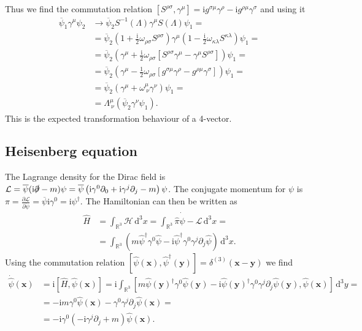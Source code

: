 \documentclass[english, parskip=full]{scrartcl}
\newcommand{\intr}{}
\newcommand{\kla}{}
\newcommand{\klam}{}
\renewcommand{\i}{\text{i}}
\begin{document}
Thus we find the commutation relation $\klam\left[ S^{\rho\sigma} , \gamma^\mu  \right] = \i g^{\sigma\mu} \gamma^\rho - \i g^{\rho\mu} \gamma^\sigma $ and using it
\begin{align}
\overline{\psi}_1 \gamma^\mu \psi_2 &\longrightarrow \overline{\psi}_2 S^{-1}(\Lambda) \gamma^\mu S(\Lambda) \psi_1 = \\
&= \overline{\psi}_2 \left( 1 + \frac{\i}{2} \omega_{\rho\sigma}S^{\rho\sigma} \right) \gamma^\mu \kla\left( 1 - \frac{\i}{2} \omega_{\kappa\lambda} S^{\kappa\lambda} \right) \psi_1 = \\
&= \overline{\psi}_2 \kla\left( \gamma^\mu + \frac{\i}{2} \omega_{\rho\sigma} \klam\left[ S^{\rho\sigma} \gamma^\mu - \gamma^\mu S^{\rho \sigma} \right] \right) \psi_1 = \\
&= \overline{\psi}_2 \kla\left( \gamma^\mu - \frac{1}{2} \omega_{\rho\sigma} \klam\left[ g^{\sigma\mu}\gamma^\rho - g^{\rho\mu} \gamma^\sigma \right] \right) \psi_1 = \\
&= \overline{\psi}_2 \kla\left( \gamma^\mu + \omega_{\ \nu}^\mu \gamma^\nu \right) \psi_1 = \\
&= \Lambda^\mu_{\ \nu} \kla\left( \overline{\psi}_2 \gamma^\nu \psi_1 \right).
\end{align}
This is the expected transformation behaviour of a 4-vector.
\subsection{Heisenberg equation}
The Lagrange density for the Dirac field is $\mathcal{L} = \overline{\psi} (\i\slashed{\partial} - m) \psi = \overline{\psi} \kla\left( \i \gamma^0\partial_0 + \i\gamma^j\partial_j - m \right) \psi$.
The conjugate momentum for $\psi$ is $\pi = \frac{\partial \mathcal{L}}{\partial \dot{\psi}} = \overline{\psi} \i \gamma^0 = \i \psi^\dagger$.
The Hamiltonian can then be written as
\begin{align}
\hat{H} &= \intr\int_{\mathbb{R}^{3}} \mathcal{H} \, \mathrm{d}^{3}x = \intr\int_{\mathbb{R}^{3}} \hat{\pi} \dot{\hat{\psi}} - \mathcal{L} \, \mathrm{d}^{3}x = \\
&= \intr\int_{\mathbb{R}^{3}} \kla\left( m\hat{\psi}^\dagger \gamma^0 \hat{\psi} - \i\hat{\psi}^\dagger \gamma^0 \gamma^j \partial_j \hat{\psi} \right) \, \mathrm{d}^{3}x.
\end{align}
Using the commutation relation $\klam\left[ \hat{\psi}(\textbf{x}), \hat{\psi}^\dagger(\textbf{y}) \right] = \delta^{(3)}(\textbf{x} - \textbf{y})$ we find
\begin{align}
\dot{\hat{\psi}}(\textbf{x}) &= \i\klam\left[ \hat{H}, \hat{\psi}(\textbf{x}) \right] = \i \intr\int_{\mathbb{R}^{3}} \klam\left[ m\hat{\psi}(\textbf{y})^\dagger \gamma^0 \hat{\psi}(\textbf{y}) - \i\hat{\psi}(\textbf{y})^\dagger \gamma^0 \gamma^j \partial_j \hat{\psi}(\textbf{y}), \hat{\psi}(\textbf{x}) \right]  \, \mathrm{d}^{3}y = \\
&= -\i m\gamma^0\hat{\psi}(\textbf{x}) - \gamma^0 \gamma^j \partial_j \hat{\psi}(\textbf{x}) = \\
&= -\i \gamma^0 \kla\left( -\i\gamma^j\partial_j + m \right)\hat{\psi}(\textbf{x}).
\end{align}
\end{document}
